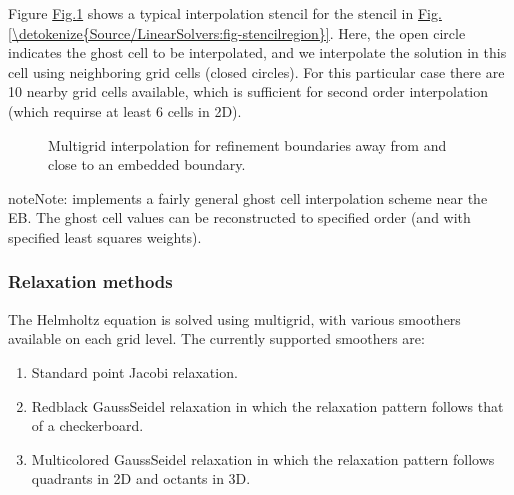 \documentclass[letterpaper,10pt,english]{sphinxmanual}
\let\sphinxpxdimen\pdfpxdimen\else\newdimen\sphinxpxdimen
\begin{document}
Figure \hyperref[\detokenize{Source/LinearSolvers:fig-ebmultigridinterpolation}]{Fig.\@ \ref{\detokenize{Source/LinearSolvers:fig-ebmultigridinterpolation}}} shows a typical interpolation stencil for the stencil in \hyperref[\detokenize{Source/LinearSolvers:fig-stencilregion}]{Fig.\@ \ref{\detokenize{Source/LinearSolvers:fig-stencilregion}}}.
Here, the open circle indicates the ghost cell to be interpolated, and we interpolate the solution in this cell using neighboring grid cells (closed circles).
For this particular case there are 10 nearby grid cells available, which is sufficient for second order interpolation (which requirse at least 6 cells in 2D).

\begin{figure}[htb]
\centering
\capstart

\noindent\sphinxincludegraphics[width=360\sphinxpxdimen]{{EBMultigridInterpolation}.png}
\caption{Multigrid interpolation for refinement boundaries away from and close to an embedded boundary.}\label{\detokenize{Source/LinearSolvers:id5}}\label{\detokenize{Source/LinearSolvers:fig-ebmultigridinterpolation}}\end{figure}

\begin{sphinxadmonition}{note}{Note:}
 implements a fairly general ghost cell interpolation scheme near the EB. The ghost cell values can be reconstructed to specified order (and with specified least squares weights).
\end{sphinxadmonition}


\subsubsection{Relaxation methods}
\label{\detokenize{Source/LinearSolvers:relaxation-methods}}
The Helmholtz equation is solved using multigrid, with various smoothers available on each grid level.
The currently supported smoothers are:
\begin{enumerate}
%
\item {} 
Standard point Jacobi relaxation.

\item {} 
Red\sphinxhyphen{}black Gauss\sphinxhyphen{}Seidel relaxation in which the relaxation pattern follows that of a checkerboard.

\item {} 
Multi\sphinxhyphen{}colored Gauss\sphinxhyphen{}Seidel relaxation in which the relaxation pattern follows quadrants in 2D and octants in 3D.

\end{enumerate}
\end{document}

